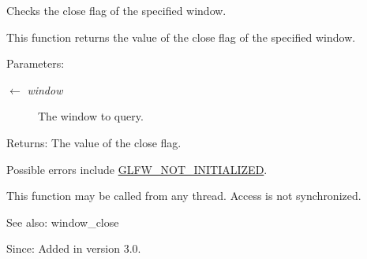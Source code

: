 Checks the close flag of the specified window. 

This function returns the value of the close flag of the specified window.

\begin{Desc}
\item[Parameters:]
\begin{description}
\item[\mbox{$\leftarrow$} {\em window}]The window to query. \end{description}
\end{Desc}
\begin{Desc}
\item[Returns:]The value of the close flag.\end{Desc}
Possible errors include \hyperlink{group__errors_g2374ee02c177f12e1fa76ff3ed15e14a}{GLFW\_\-NOT\_\-INITIALIZED}.

This function may be called from any thread. Access is not synchronized.

\begin{Desc}
\item[See also:]window\_\-close\end{Desc}
\begin{Desc}
\item[Since:]Added in version 3.0. \end{Desc}
